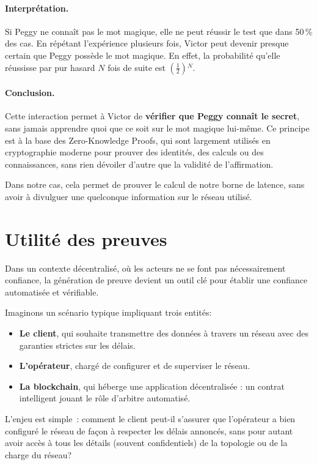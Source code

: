 \documentclass[12pt]{report}
\begin{document}
\paragraph{Interprétation.} Si Peggy ne connaît pas le mot magique, 
elle ne peut réussir le test que dans 50\,\% des cas. 
En répétant l'expérience plusieurs fois, Victor peut devenir 
presque certain que Peggy possède le mot magique. En effet, 
la probabilité qu'elle réussisse par pur hasard $N$ fois de suite 
est $\left(\frac{1}{2}\right){}^N$.

\paragraph{Conclusion.} Cette interaction permet à Victor de 
\textbf{vérifier que Peggy connaît le secret}, sans jamais 
apprendre quoi que ce soit sur le mot magique lui-même. 
Ce principe est à la base des Zero-Knowledge Proofs, qui sont 
largement utilisés en cryptographie moderne pour prouver des 
identités, des calculs ou des connaissances, sans rien dévoiler 
d'autre que la validité de l'affirmation.

\vspace{0.5cm}

Dans notre cas, cela permet de prouver le calcul de notre borne de latence,
sans avoir à divulguer une quelconque information sur le réseau utilisé.

\section*{Utilité des preuves}

Dans un contexte décentralisé, où les acteurs ne se font pas nécessairement confiance, la génération de preuve devient un outil clé pour établir une confiance automatisée et vérifiable.

Imaginons un scénario typique impliquant trois entités:
\begin{itemize}
    \item \textbf{Le client}, qui souhaite transmettre des données à travers un réseau avec des garanties strictes sur les délais.
    \item \textbf{L'opérateur}, chargé de configurer et de superviser le réseau.
    \item \textbf{La blockchain}, qui héberge une application décentralisée : un contrat intelligent jouant le rôle d'arbitre automatisé.
\end{itemize}

L'enjeu est simple : comment le client peut-il s'assurer que l'opérateur a bien configuré le réseau de façon à respecter les délais annoncés, sans pour autant avoir accès à tous les détails (souvent confidentiels) de la topologie ou de la charge du réseau?
\end{document}
